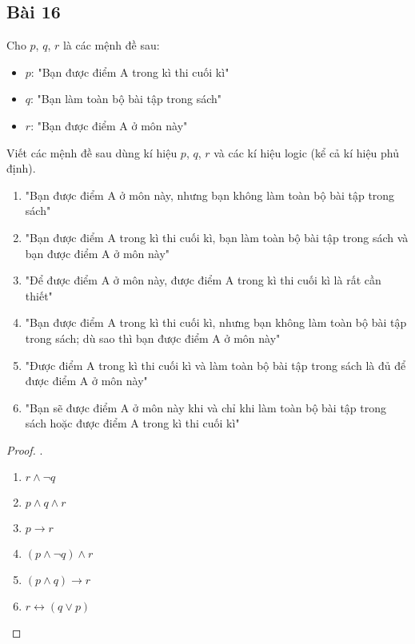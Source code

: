 \subsection*{Bài 16}
Cho $p$, $q$, $r$ là các mệnh đề sau: \begin{itemize}
    \item $p$: "Bạn được điểm A trong kì thi cuối kì"
    \item $q$: "Bạn làm toàn bộ bài tập trong sách"
    \item $r$: "Bạn được điểm A ở môn này"
\end{itemize}
Viết các mệnh đề sau dùng kí hiệu $p$, $q$, $r$ và các kí hiệu logic (kể cả kí hiệu phủ định).
\begin{enumerate}[label=\alph*)]
    \item "Bạn được điểm A ở môn này, nhưng bạn không làm toàn bộ bài tập trong sách"
    \item "Bạn được điểm A trong kì thi cuối kì, bạn làm toàn bộ bài tập trong sách và bạn được điểm A ở môn này"
    \item "Để được điểm A ở môn này, được điểm A trong kì thi cuối kì là rất cần thiết"
    \item "Bạn được điểm A trong kì thi cuối kì, nhưng bạn không làm toàn bộ bài tập trong sách; dù sao thì bạn được điểm A ở môn này"
    \item "Được điểm A trong kì thi cuối kì và làm toàn bộ bài tập trong sách là đủ để được điểm A ở môn này"
    \item "Bạn sẽ được điểm A ở môn này khi và chỉ khi làm toàn bộ bài tập trong sách hoặc được điểm A trong kì thi cuối kì"
\end{enumerate}
\begin{proof}.
    \begin{multicols}{3}
        \begin{enumerate}[label=\alph*)]
            \item $r\land \neg q$
            \item $p\land q\land r$
            \item $p\rightarrow r$
            \item $(p\land \neg q)\land r$
            \item $(p\land q)\rightarrow r$
            \item $r\leftrightarrow (q\lor p)$
        \end{enumerate}
    \end{multicols}
\end{proof}
